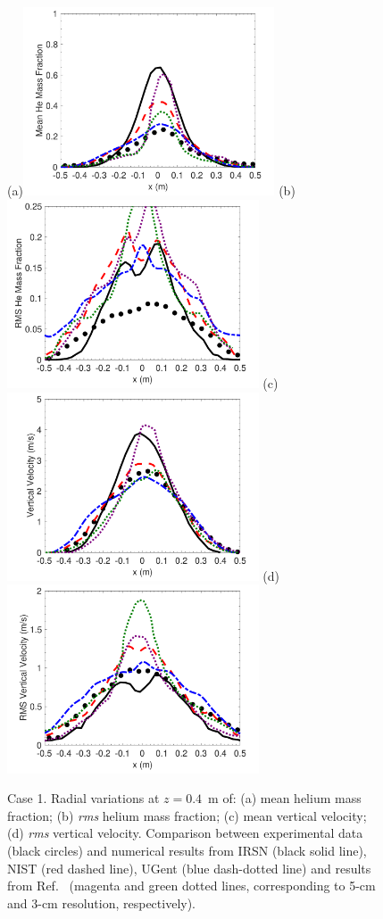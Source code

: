 \begin{figure}
\centering
(a)\includegraphics[height=2.2in]{Figures/Case1-Fig1a.pdf}
(b)\includegraphics[height=2.2in]{Figures/Case1-Fig1b.pdf}
(c)\includegraphics[height=2.2in]{Figures/Case1-Fig1c.pdf}
(d)\includegraphics[height=2.2in]{Figures/Case1-Fig1d.pdf}
\caption{Case 1. Radial variations at $z = 0.4$~m of: (a) mean helium mass fraction; (b) {\it rms} helium mass fraction; (c) mean vertical velocity; (d) {\it rms} vertical velocity. Comparison between experimental data (black circles) and numerical results from IRSN (black solid line), NIST (red dashed line), UGent (blue dash-dotted line) and results from Ref.~\cite{DesJardin:2004} (magenta and green dotted lines, corresponding to 5-cm and 3-cm resolution, respectively).}
\label{fig:Case1-Fig1}
\end{figure}

